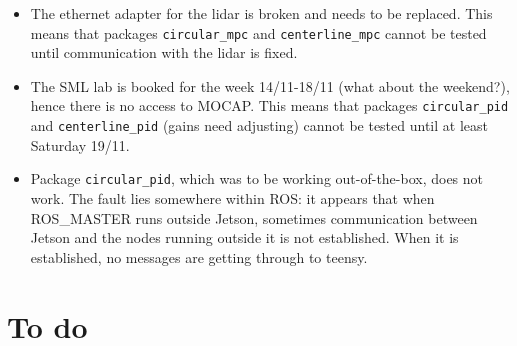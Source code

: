 \documentclass[oneside,12pt]{article}
\begin{document}
\begin{itemize}
  \item The ethernet adapter for the lidar is broken and needs to be replaced.
    This means that packages \texttt{circular\_mpc} and \texttt{centerline\_mpc}
    cannot be tested until communication with the lidar is fixed.
  \item The SML lab is booked for the week 14/11-18/11 (what about the weekend?),
    hence there is no access to MOCAP. This means that packages
    \texttt{circular\_pid} and \texttt{centerline\_pid} (gains need adjusting)
    cannot be tested until at least Saturday 19/11.
  \item Package \texttt{circular\_pid}, which was to be working out-of-the-box,
    does not work. The fault lies somewhere within ROS: it appears that when
    ROS\_MASTER runs outside Jetson, sometimes communication between Jetson and the
    nodes running outside it is not established. When it is established, no
    messages are getting through to teensy.
\end{itemize}


\section{To do}
\end{document}
